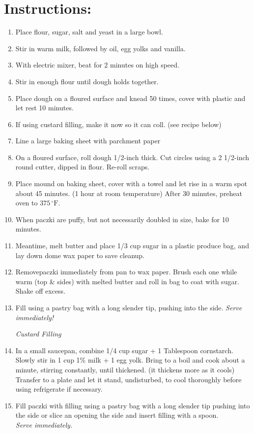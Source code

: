 \section{Instructions:}
\begin{enumerate}
\item Place flour, sugar, salt and yeast in a large bowl.
\item Stir in warm milk, followed by oil, egg yolks and vanilla.
\item With electric mixer, beat for 2 minutes on high speed.
\item Stir in enough flour until dough holds together.
\item Place dough on a floured surface and knead 50 times, cover 
with plastic and let rest 10 minutes.
\item If using custard filling, make it now so it can coll. 
(see recipe below)
\item Line a large baking sheet with parchment paper
\item On a floured surface, roll dough 1/2-inch thick. Cut circles 
using a 2 1/2-inch round cutter, dipped in flour. Re-roll scraps.
\item Place mound on baking sheet, cover with a towel and let rise 
in a warm spot about 45 minutes. (1 hour at room temperature) 
After 30 minutes, preheat oven to $375\,^{\circ}\mathrm{F}$.
\item When paczki are puffy, but not necessarily doubled in size, 
bake for 10 minutes.
\item Meantime, melt butter and place 1/3 cup sugar in a plastic 
produce bag, and lay down dome wax paper to save cleanup.
\item Removepaczki immediately from pan to wax paper. Brush each 
one while warm (top \& sides) with melted butter and roll in 
bag to coat with sugar. Shake off excess.
\item Fill using a pastry bag with a long slender tip, pushing 
into the side. \emph{Serve immediately!}

\emph{Custard Filling}
\item In a small saucepan, combine 1/4 cup sugar + 1 Tablespoon 
cornstarch. Slowly stir in 1 cup 1\% milk + 1 egg yolk. Bring 
to a boil and cook about a minute, stirring constantly, until 
thickened. (it thickens more as it cools) Transfer to a plate 
and let it stand, undisturbed, to cool thoroughly before using 
\- refrigerate if necessary.
\item Fill paczki with filling using a pastry bag with a long 
slender tip pushing into the side or slice an opening the 
side and insert filling with a spoon. \\
\emph{Serve immediately.} 

\end{enumerate}
